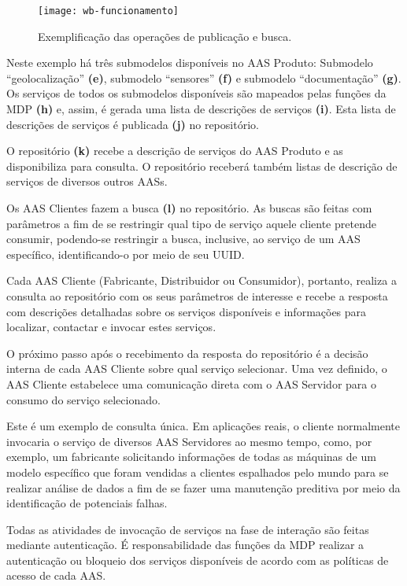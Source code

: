 	\begin{figure}[htb]
		\centering
		\caption{Exemplificação das operações de publicação e busca.}
		\label{fig:wb-funcionamento}
		\texttt{[image: wb-funcionamento]}
	\end{figure}

	Neste exemplo há três submodelos disponíveis no AAS Produto: Submodelo ``geolocalização'' \textbf{(e)}, submodelo ``sensores'' \textbf{(f)} e submodelo ``documentação'' \textbf{(g)}. Os serviços de todos os submodelos disponíveis são mapeados pelas funções da MDP \textbf{(h)} e, assim, é gerada uma lista de descrições de serviços \textbf{(i)}. Esta lista de descrições de serviços é publicada \textbf{(j)} no repositório.
	
	O repositório \textbf{(k)} recebe a descrição de serviços do AAS Produto e as disponibiliza para consulta. O repositório receberá também listas de descrição de serviços de diversos outros AASs.
	
	Os AAS Clientes fazem a busca \textbf{(l)} no repositório. As buscas são feitas com parâmetros a fim de se restringir qual tipo de serviço aquele cliente pretende consumir, podendo-se restringir a busca, inclusive, ao serviço de um AAS específico, identificando-o por meio de seu UUID.
	
	Cada AAS Cliente (Fabricante, Distribuidor ou Consumidor), portanto, realiza a consulta ao repositório com os seus parâmetros de interesse e recebe a resposta com descrições detalhadas sobre os serviços disponíveis e informações para localizar, contactar e invocar estes serviços.
	
	O próximo passo após o recebimento da resposta do repositório é a decisão interna de cada AAS Cliente sobre qual serviço selecionar. Uma vez definido, o AAS Cliente estabelece uma comunicação direta com o AAS Servidor para o consumo do serviço selecionado.
	
	Este é um exemplo de consulta única. Em aplicações reais, o cliente normalmente invocaria o serviço de diversos AAS Servidores ao mesmo tempo, como, por exemplo, um fabricante solicitando informações de todas as máquinas de um modelo específico que foram vendidas a clientes espalhados pelo mundo para se realizar análise de dados a fim de se fazer uma manutenção preditiva por meio da identificação de potenciais falhas.
	
	Todas as atividades de invocação de serviços na fase de interação são feitas mediante autenticação. É responsabilidade das funções da MDP realizar a autenticação ou bloqueio dos serviços disponíveis de acordo com as políticas de acesso de cada AAS.
	
